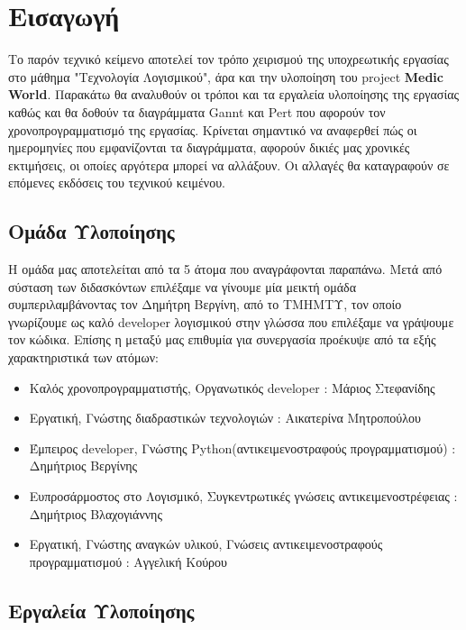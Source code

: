 \documentclass{article}
\begin{document}
{
  \hypersetup{linkcolor=black}
  \tableofcontents
}


\newpage


\section{Εισαγωγή}
   

 Το παρόν τεχνικό κείμενο αποτελεί τον τρόπο χειρισμού της υποχρεωτικής εργασίας στο μάθημα "Τεχνολογία Λογισμικού", άρα και την υλοποίηση του project \textbf{Medic World}. Παρακάτω θα αναλυθούν οι τρόποι και τα εργαλεία υλοποίησης της εργασίας καθώς και θα δοθούν τα διαγράμματα Gannt και Pert που αφορούν τον χρονοπρογραμματισμό της εργασίας. Κρίνεται σημαντικό να αναφερθεί πώς οι ημερομηνίες που εμφανίζονται τα διαγράμματα, αφορούν δικιές μας χρονικές εκτιμήσεις, οι οποίες αργότερα μπορεί να αλλάξουν. Οι αλλαγές θα καταγραφούν σε επόμενες εκδόσεις του τεχνικού κειμένου. 
 
 
\subsection{Ομάδα Υλοποίησης}

Η ομάδα μας αποτελείται από τα 5 άτομα που αναγράφονται παραπάνω. Μετά από σύσταση των διδασκόντων επιλέξαμε να γίνουμε μία μεικτή ομάδα συμπεριλαμβάνοντας τον Δημήτρη Βεργίνη, από το ΤΜΗΜΤΥ, τον οποίο γνωρίζουμε ως καλό developer λογισμικού στην γλώσσα που επιλέξαμε να γράψουμε τον κώδικα. Επίσης η μεταξύ μας επιθυμία για συνεργασία προέκυψε από τα εξής χαρακτηριστικά των ατόμων:
 

\begin{itemize}
  \item Καλός χρονοπρογραμματιστής, Οργανωτικός developer : Μάριος Στεφανίδης
  \item Εργατική, Γνώστης διαδραστικών τεχνολογιών : Αικατερίνα Μητροπούλου
  \item Έμπειρος developer, Γνώστης Python(αντικειμενοστραφούς προγραμματισμού) : Δημήτριος Βεργίνης
  \item Ευπροσάρμοστος στο Λογισμικό, Συγκεντρωτικές γνώσεις αντικειμενοστρέφειας : Δημήτριος Βλαχογιάννης
  \item Εργατική, Γνώστης αναγκών υλικού, Γνώσεις αντικειμενοστραφούς προγραμματισμού : Αγγελική Κούρου 
\end{itemize}


\subsection{Εργαλεία Υλοποίησης}
\end{document}
